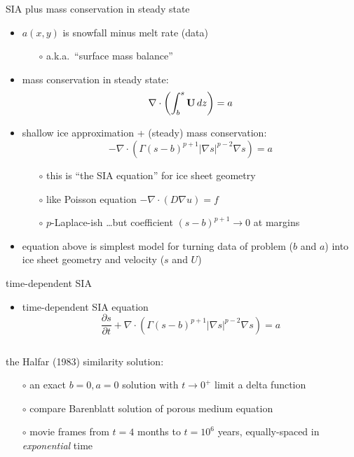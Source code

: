 \documentclass[hide notes,intlimits]{beamer}
\newcommand{\Div}{\nabla\cdot}
\newcommand{\grad}{\nabla}
\begin{document}
\begin{frame}{SIA plus mass conservation in steady state}

\begin{itemize}
\item $a(x,y)$ is snowfall minus melt rate (data)
  \begin{itemize}
  \item[$\circ$] a.k.a.~``surface mass balance''
  \end{itemize}
\item mass conservation in steady state: 
  $$\Div \left(  \int_b^s {\bf U}\, dz \right)  =  a$$
\item shallow ice approximation + (steady) mass conservation:
  $$-\Div \left(\Gamma (s-b)^{p+1} | \nabla s |^{p-2} \nabla s\right) =  a$$
  \begin{itemize}
  \vspace{-0.2in}
  \item[$\circ$] this is ``the SIA equation'' for ice sheet geometry
  \item[$\circ$] like Poisson equation $-\Div (D \grad u) = f$
  \item[$\circ$] $p$-Laplace-ish \dots but coefficient $(s-b)^{p+1} \to 0$ at margins
  \end{itemize}
\item equation above is simplest model for turning data of problem ($b$ and $a$) into ice sheet geometry and velocity ($s$ and $U$)
\end{itemize}
\end{frame}


\begin{frame}{time-dependent SIA}

\begin{itemize}
\item time-dependent SIA equation
  $$\frac{\partial s}{\partial t} + \Div \left(\Gamma (s-b)^{p+1} | \nabla s |^{p-2} \nabla s\right) = a$$
\end{itemize}

\begin{columns}
\begin{column}{0.4\textwidth}
\scriptsize
the Halfar (1983) similarity solution:
  \begin{itemize}
  \scriptsize
  \item[$\circ$] an exact $b=0,a=0$ solution with $t\to 0^+$ limit a delta function
  \item[$\circ$] compare Barenblatt solution of porous medium equation
  \item[$\circ$] movie frames from $t=4$ months to $t = 10^6$ years, equally-spaced in \emph{exponential} time
  \end{itemize}
\end{column}

\begin{column}{0.65\textwidth}
\vspace{-0.25in}
\begin{center}
\end{center}
\end{column}
\end{columns}
\end{frame}
\end{document}
